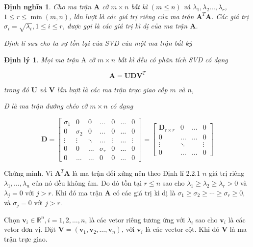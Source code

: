 \documentclass[12pt,a4paper,oneside]{report}
\newtheorem{dl}{Định lý}[section]
\newtheorem{dn}{Định nghĩa}[section]
\numberwithin{equation}{section}
\begin{document}
\begin{dn}\rm Cho ma trận $\mathbf{A}$ cỡ $m \times n$ bất kì $(m \leqslant n)$ và $\lambda_{1}, \lambda_{2} \ldots, \lambda_{r}$, $1 \leqslant r \leqslant \min (m, n)$, lần lượt là các giá trị riêng của ma trận $\mathbf{A}^{T} \mathbf{A}$. Các giá trị $\sigma_{i}=\sqrt{\lambda_{i}}, 1 \leqslant i \leqslant r$, được gọi là các giá trị kì dị của ma trận $\mathbf{A}$.

Định lí sau cho ta sự tồn tại của SVD của một ma trận bất kỳ
\end{dn}

\begin{dl}Mọi ma trận $\mathrm{A}$ cỡ $m \times n$ bất kì đều có phân tích SVD có dạng

$$
\mathbf{A}=\mathbf{U D V}^{T}
$$

trong đó $\mathbf{U}$ và $\mathbf{V}$ lần lượt là các ma trận trực giao cấp $m$ và $n$,

D là ma trận đường chéo cỡ $m \times n$ có dạng

$$
\mathbf{D}=\left[\begin{array}{ccccccc}
	\sigma_{1} & 0 & 0 & \ldots & 0 & \ldots & 0 \\
	0 & \sigma_{2} & 0 & \ldots & 0 & \ldots & 0 \\
	\vdots & \vdots & \ddots & \ldots & \vdots & \ldots & \vdots \\
	0 & 0 & \ldots & \sigma_{r} & 0 & \ldots & 0 \\
	0 & \ldots & \ldots & 0 & 0 & \ldots & 0
\end{array}\right]=\left[\begin{array}{cccc}
	\mathbf{D}_{r \times r} & 0 & \ldots & 0 \\
	0 & \ldots & \ldots & 0 \\
	\vdots & \ddots & & \vdots \\
	0 & \ldots & \ldots & 0
\end{array}\right]
$$
\end{dl}
Chứng minh. Vì $\mathbf{A}^{T} \mathbf{A}$ là ma trận đối xứng nên theo Định lí 2.2.1 $n$ giá trị riêng $\lambda_{1}, \ldots, \lambda_{n}$ của nó đều không âm. Do đó tồn tại $r \leqslant n$ sao cho $\lambda_{1} \geqslant \lambda_{2} \geqslant \lambda_{r}>0$ và $\lambda_{j}=0$ với $j>r$. Khi đó ma trận $\mathbf{A}$ có các giá trị kì dị là $\sigma_{1} \geqslant \sigma_{2} \geqslant \cdots \geqslant \sigma_{r} \geqslant 0$, và $\sigma_{j}=0$ với $j>r$.

Chọn $\mathbf{v}_{i} \in \mathbb{R}^{n}, i=1,2, \ldots, n$, là các vetor riêng tương ứng với $\lambda_{i}$ sao cho $\mathbf{v}_{i}$ là các vetor đơn vị. Đặt $\mathbf{V}=\left(\mathbf{v}_{1}, \mathbf{v}_{2}, \ldots, \mathbf{v}_{n}\right)$, với $\mathbf{v}_{i}$ là các vector cột. Khi đó $\mathbf{V}$ là ma trận trực giao.
\end{document}
